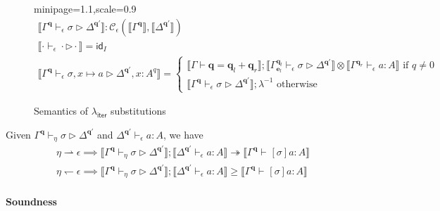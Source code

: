 \documentclass[acmsmall,screen,anonymous,review]{acmart}
\newcommand{\mc}[1]{\ensuremath{\mathcal{#1}}}
\newcommand{\mb}[1]{\ensuremath{\mathbf{#1}}}
\newcommand{\ms}[1]{\ensuremath{\mathsf{#1}}}
\newcommand{\qsp}[4]{#1 \vdash #2 = #3 + #4}
\newcommand{\hasty}[4]{#1 \vdash_{#2} #3: {#4}}
\newcommand{\issubst}[4]{#1 \vdash_{#2} #3 \rhd #4}
\newcommand{\cref}{\twoheadrightarrow}
\newcommand{\dnt}[1]{\llbracket{#1}\rrbracket}
\newcommand{\subiterexp}{\texorpdfstring{\(\lambda_{\ms{iter}}\)}{lambda-iter}}
\newcommand{\rightmove}{\rightharpoonup}
\newcommand{\leftmove}{\leftharpoondown}
\begin{document}
\begin{figure}
  \begin{adjustbox}{minipage=1.1\textwidth,scale=0.9}
  \begin{gather*}
    \boxed{\dnt{\issubst{\Gamma^{\mb{q}}}{\epsilon}{\sigma}{\Delta^{\mb{q}'}}}
      : \mc{C}_\epsilon(\dnt{\Gamma^{\mb{q}}}, \dnt{\Delta^{\mb{q}'}})} \\
    \dnt{\issubst{\cdot}{\epsilon}{\cdot}{\cdot}} = \ms{id}_I
    \\
    \dnt{\issubst{\Gamma^{\mb{q}}}{\epsilon}{\sigma, x \mapsto a}{\Delta^{\mb{q}'}, x : A^q}}
    = \begin{cases}
      \dnt{\qsp{\Gamma}{\mb{q}}{\mb{q}_l}{\mb{q}_r}} 
      ; \dnt{\issubst{\Gamma^{\mb{q}_l}_{\mb{e}_l}}{\epsilon}{\sigma}{\Delta^{\mb{q}'}}}
      \otimes \dnt{\hasty{\Gamma^{\mb{q}_r}}{\epsilon}{a}{A}}
      \text{ if } q \neq 0 \\
      \dnt{\issubst{\Gamma^{\mb{q}}}{\epsilon}{\sigma}{\Delta^{\mb{q}'}}}
      ; \lambda^{-1} \text{ otherwise}
    \end{cases}
  \end{gather*}
  \end{adjustbox}
  \caption{Semantics of \subiterexp{} substitutions}
  \Description{}
  \label{fig:subst-den}
\end{figure}

\begin{theorem}
  Given $\issubst{\Gamma^{\mb{q}}}{\eta}{\sigma}{\Delta^{\mb{q'}}}$ and
  $\hasty{\Delta^{\mb{q}'}}{\epsilon}{a}{A}$, we have
  \begin{align*}
  \eta \rightmove \epsilon \implies
  \dnt{\issubst{\Gamma^{\mb{q}}}{\eta}{\sigma}{\Delta^{\mb{q'}}}} 
    ; \dnt{\hasty{\Delta^{\mb{q}'}}{\epsilon}{a}{A}}
  \cref \dnt{\hasty{\Gamma^{\mb{q}}}{}{[\sigma]a}{A}} \\
  \eta \leftmove \epsilon \implies
  \dnt{\issubst{\Gamma^{\mb{q}}}{\eta}{\sigma}{\Delta^{\mb{q'}}}} 
    ; \dnt{\hasty{\Delta^{\mb{q}'}}{\epsilon}{a}{A}}
  \geq \dnt{\hasty{\Gamma^{\mb{q}}}{}{[\sigma]a}{A}}
  \end{align*}
\end{theorem}

\paragraph{Soundness}
\end{document}

